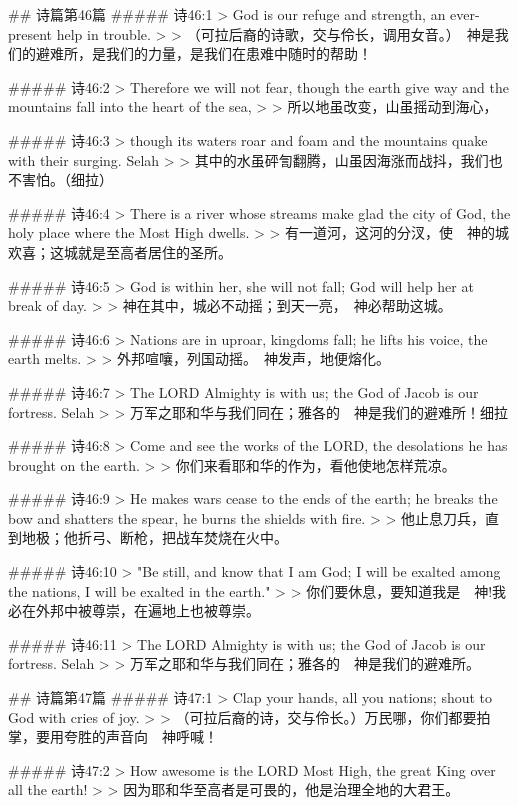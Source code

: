 ## 诗篇第46篇
##### 诗46:1
> God is our refuge and strength, an ever-present help in trouble.
>
> （可拉后裔的诗歌，交与伶长，调用女音。）　神是我们的避难所，是我们的力量，是我们在患难中随时的帮助！


##### 诗46:2
> Therefore we will not fear, though the earth give way and the mountains fall into the heart of the sea,
>
> 所以地虽改变，山虽摇动到海心，


##### 诗46:3
> though its waters roar and foam and the mountains quake with their surging. Selah
>
> 其中的水虽砰訇翻腾，山虽因海涨而战抖，我们也不害怕。（细拉）


##### 诗46:4
> There is a river whose streams make glad the city of God, the holy place where the Most High dwells.
>
> 有一道河，这河的分汊，使　神的城欢喜；这城就是至高者居住的圣所。


##### 诗46:5
> God is within her, she will not fall; God will help her at break of day.
>
> 神在其中，城必不动摇；到天一亮，　神必帮助这城。


##### 诗46:6
> Nations are in uproar, kingdoms fall; he lifts his voice, the earth melts.
>
> 外邦喧嚷，列国动摇。　神发声，地便熔化。


##### 诗46:7
> The LORD Almighty is with us; the God of Jacob is our fortress. Selah
>
> 万军之耶和华与我们同在；雅各的　神是我们的避难所！细拉


##### 诗46:8
> Come and see the works of the LORD, the desolations he has brought on the earth.
>
> 你们来看耶和华的作为，看他使地怎样荒凉。


##### 诗46:9
> He makes wars cease to the ends of the earth; he breaks the bow and shatters the spear, he burns the shields with fire.
>
> 他止息刀兵，直到地极；他折弓、断枪，把战车焚烧在火中。


##### 诗46:10
> "Be still, and know that I am God; I will be exalted among the nations, I will be exalted in the earth."
>
> 你们要休息，要知道我是　神!我必在外邦中被尊崇，在遍地上也被尊崇。


##### 诗46:11
> The LORD Almighty is with us; the God of Jacob is our fortress. Selah
>
> 万军之耶和华与我们同在；雅各的　神是我们的避难所。


## 诗篇第47篇
##### 诗47:1
> Clap your hands, all you nations; shout to God with cries of joy.
>
> （可拉后裔的诗，交与伶长。）万民哪，你们都要拍掌，要用夸胜的声音向　神呼喊！


##### 诗47:2
> How awesome is the LORD Most High, the great King over all the earth!
>
> 因为耶和华至高者是可畏的，他是治理全地的大君王。


